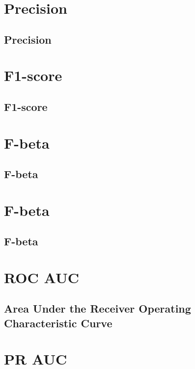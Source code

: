 \clearpage
\thispagestyle{classificationstyle}
\section{Precision}
\subsection{Precision}

\clearpage
\thispagestyle{classificationstyle}
\section{F1-score}
\subsection{F1-score}

\clearpage
\thispagestyle{classificationstyle}
\section{F-beta}
\subsection{F-beta}

\clearpage
\thispagestyle{classificationstyle}
\section{F-beta}
\subsection{F-beta}

\clearpage
\thispagestyle{classificationstyle}
\section{ROC AUC}
\subsection{Area Under the Receiver Operating Characteristic Curve}

\clearpage
\thispagestyle{classificationstyle}
\section{PR AUC}
